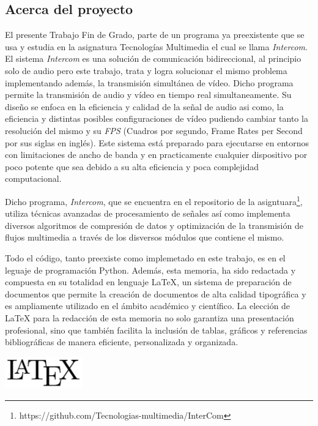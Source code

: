 \label{sec:justificacion_y_objetivos}

\subsection{Acerca del proyecto}

El presente Trabajo Fin de Grado, parte de un programa ya preexistente que se usa y estudia en la asignatura Tecnologías Multimedia el cual se llama \textit{Intercom}. El sistema \textit{Intercom} es una solución de comunicación bidireccional, al principio solo de audio pero este trabajo, trata y logra solucionar el mismo problema implementando además, la transmisión simultánea de vídeo. Dicho programa permite la transmisión de audio y vídeo en tiempo real simultaneamente. Su diseño se enfoca en la eficiencia y calidad de la señal de audio asi como, la eficiencia y distintas posibles configuraciones de vídeo pudiendo cambiar tanto la resolución del mismo y su \textit{FPS} (Cuadros por segundo, Frame Rates per Second por sus siglas en inglés). Este sistema está preparado para ejecutarse en entornos con limitaciones de ancho de banda y en practicamente cualquier dispositivo por poco potente que sea debido a su alta eficiencia y poca complejidad computacional.
\vspace{\baselineskip}

Dicho programa, \textit{Intercom}, que se encuentra en el repositorio de la asigntuara\footnote{https://github.com/Tecnologias-multimedia/InterCom}, utiliza técnicas avanzadas de procesamiento de señales así como implementa diversos algoritmos de compresión de datos y optimización de la transmisión de flujos multimedia a través de los disversos módulos que contiene el mismo. 

\vspace{\baselineskip}
Todo el código, tanto preexiste como implemetado en este trabajo, es en el leguaje de programación Python. Además, esta memoria, ha sido redactada y compuesta en su totalidad en lenguaje LaTeX, un sistema de preparación de documentos que permite la creación de documentos de alta calidad tipográfica y es ampliamente utilizado en el ámbito académico y científico. La elección de LaTeX para la redacción de esta memoria no solo garantiza una presentación profesional, sino que también facilita la inclusión de tablas, gráficos y referencias bibliográficas de manera eficiente, personalizada y organizada.

\vspace{\baselineskip}
\begin{center}
	\includegraphics[width = 0.25\textwidth]{images/LaTeX_logo.png}
	\label{fig:latex}
\end{center}
\vspace{\baselineskip}

